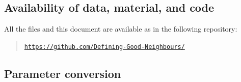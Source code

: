 \documentclass[11pt]{article}
\numberwithin{equation}{section}
\begin{document}
\subsection{Availability of data, material, and code}
\label{app:one}
All the files and this document are available as in the following repository:
\begin{quote}
    \noindent \href{https://github.com/Defining-Good-Neighbours/}{\texttt{https://github.com/Defining-Good-Neighbours/}}
\end{quote}


\subsection{Parameter conversion}
\label{app:two}
\end{document}
